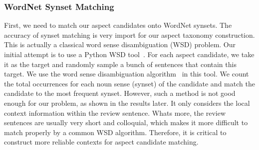 \subsubsection{WordNet Synset Matching}
\label{sec:match}
First, we need to match our aspect candidates onto WordNet synsets.
The accuracy of synset matching is very import for our 
aspect taxonomy construction.
This is actually a classical word sense disambiguation (WSD) problem.
Our initial attempt is to use a Python WSD tool~\cite{pywsd14}.
For each aspect candidate, we take it as the target and 
randomly sample a bunch of sentences that contain this target. 
We use the word sense disambiguation algorithm~\cite{lesk1986automatic} 
in this tool. We count the total occurrences for each noun 
sense (synset) of the candidate and match the candidate to the most frequent
synset.  However, such a method is not good enough for our problem,
as shown in the results later.
It only considers the local context information within the review sentence. 
Whats more, the review sentences are usually very 
short and colloquial, which makes it 
more difficult to match properly by a common WSD algorithm.
Therefore, it is critical to construct more reliable contexts for 
aspect candidate matching. 

